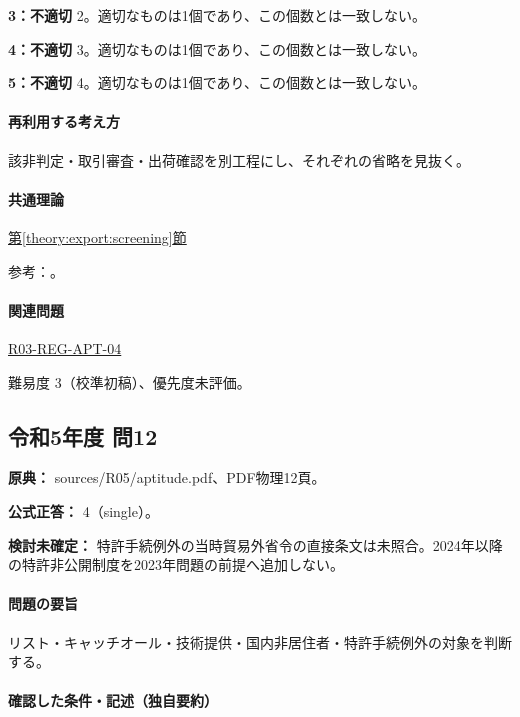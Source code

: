 \noindent\textbf{3：不適切} 2。適切なものは1個であり、この個数とは一致しない。\par

\noindent\textbf{4：不適切} 3。適切なものは1個であり、この個数とは一致しない。\par

\noindent\textbf{5：不適切} 4。適切なものは1個であり、この個数とは一致しない。\par

\paragraph{再利用する考え方} 該非判定・取引審査・出荷確認を別工程にし、それぞれの省略を見抜く。

\paragraph{共通理論} \hyperref[theory:export:screening]{第\ref*{theory:export:screening}節}

\par 参考：\cite{export_overview,export_current_updates}。

\paragraph{関連問題} \hyperref[q:r03-reg-apt-04]{R03-REG-APT-04}

\par 難易度 3（校準初稿）、優先度未評価。

\subsection{令和5年度 問12}
\label{q:r05-reg-apt-12}

\noindent\textbf{原典：} sources/R05/aptitude.pdf、PDF物理12頁。

\textbf{公式正答：} 4（single）。

\par\textbf{検討未確定：} 特許手続例外の当時貿易外省令の直接条文は未照合。2024年以降の特許非公開制度を2023年問題の前提へ追加しない。

\paragraph{問題の要旨} リスト・キャッチオール・技術提供・国内非居住者・特許手続例外の対象を判断する。

\paragraph{確認した条件・記述（独自要約）}\mbox{}\par

